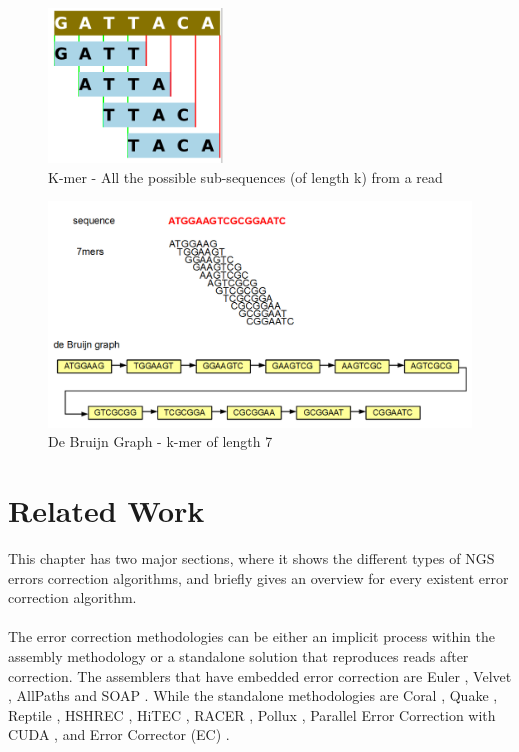 \documentclass[12pt,openany]{llncs}
\begin{document}
\newpage
\begin{figure}
	\centering
	\includegraphics[width=.3\linewidth]{./figs/CrrConcepts-1}
	\caption{\label{fig:fig-CrrConcepts-1}{K-mer} - All the possible sub-sequences (of length k) from a read}
\end{figure}
\vspace{2cm}
\begin{figure}
	\centering
	\includegraphics[width=.8\linewidth]{./figs/CrrConcepts-2}
	\caption{\label{fig:fig-CrrConcepts-2}{De Bruijn Graph} - k-mer of length 7}
\end{figure}
%

\newpage
\chapter{\label{chap:3}Related Work}
This chapter has two major sections, where it shows the different types of NGS errors correction algorithms, and briefly gives an overview for every existent error correction algorithm.
\\
\\
The error correction methodologies can be either an implicit process within the assembly methodology or a standalone solution that reproduces reads after correction. The assemblers that have embedded error correction are Euler \cite{Euler}, Velvet \cite{Velvet}, AllPaths \cite{AllPaths} and SOAP \cite{Soap}. While the standalone methodologies are Coral \cite{Coral}, Quake \cite{Quake}, Reptile \cite{Reptile}, HSHREC \cite{HShrec}, HiTEC \cite{HiTec}, RACER \cite{Racer}, Pollux \cite{Pollux}, Parallel Error Correction with CUDA \cite{Cuda}, and Error Corrector (EC) \cite{EC}.
\end{document}
